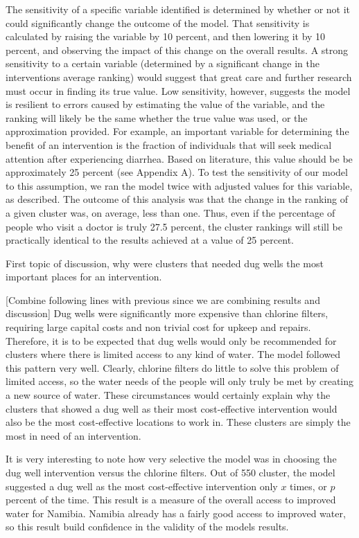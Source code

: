 The sensitivity of a specific variable identified is determined by whether or not it could significantly change the outcome of the model.
That sensitivity is calculated by raising the variable by 10 percent, and then lowering it by 10 percent, and observing the impact of this change on the overall results.
A strong sensitivity to a certain variable (determined by a significant change in the interventions average ranking) would suggest that great care and further research must occur in finding its true value.
Low sensitivity, however, suggests the model is resilient to errors caused by estimating the value of the variable, and the ranking will likely be the same whether the true value was used, or the approximation provided.
For example, an important variable for determining the benefit of an intervention is the fraction of individuals that will seek medical attention after experiencing diarrhea.
Based on literature, this value should be be approximately 25 percent (see Appendix A).
To test the sensitivity of our model to this assumption, we ran the model twice with adjusted values for this variable, as described.
The outcome of this analysis was that the change in the ranking of a given cluster was, on average, less than one.
Thus, even if the percentage of people who visit a doctor is truly 27.5 percent, the cluster rankings will still be practically identical to the results achieved at a value of 25 percent.

First topic of discussion, why were clusters that needed dug wells the most important places for an intervention. 

[Combine following lines with previous since we are combining results and discussion]
Dug wells were significantly more expensive than chlorine filters, requiring large capital costs and non trivial cost for upkeep and repairs. 
Therefore, it is to be expected that dug wells would only be recommended for clusters where there is limited access to any kind of water. 
The model followed this pattern very well.
Clearly, chlorine filters do little to solve this problem of limited access, so the water needs of the people will only truly be met by creating a new source of water. 
These circumstances would certainly explain why the clusters that showed a dug well as their most cost-effective intervention would also be the most cost-effective locations to work in. These clusters are simply the most in need of an intervention.  

It is very interesting to note how very selective the model was in choosing the dug well intervention versus the chlorine filters.
Out of 550 cluster, the model suggested a dug well as the most cost-effective intervention only $x$ times, or $p$ percent of the time.
This result is a measure of the overall access to improved water for Namibia. 
Namibia already has a fairly good access to improved water, so this result build confidence in the validity of the models results.